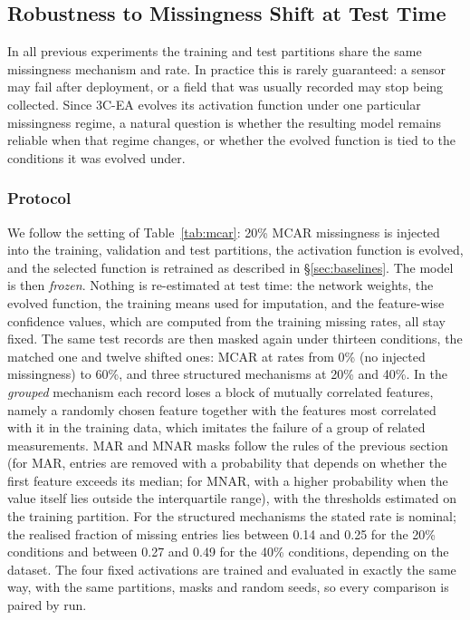 
\subsection{Robustness to Missingness Shift at Test Time}
\label{sec:shift}

In all previous experiments the training and test partitions share the same missingness mechanism and rate. In practice
this is rarely guaranteed: a sensor may fail after deployment, or a field that was usually recorded may stop being
collected. Since 3C-EA evolves its activation function under one particular missingness regime, a natural question is
whether the resulting model remains reliable when that regime changes, or whether the evolved function is tied to the
conditions it was evolved under.

\subsubsection{Protocol}
We follow the setting of Table~\ref{tab:mcar}: 20\% MCAR missingness is injected into the training, validation and
test partitions, the activation function is evolved, and the selected function is retrained as described in
\S\ref{sec:baselines}. The model is then \emph{frozen}. Nothing is re-estimated at test time: the network weights, the
evolved function, the training means used for imputation, and the feature-wise confidence values, which are computed
from the training missing rates, all stay fixed. The same test records are then masked again under thirteen
conditions, the matched one and twelve shifted ones: MCAR at rates from 0\% (no injected missingness) to 60\%, and three structured mechanisms at 20\% and
40\%. In the \emph{grouped} mechanism each record loses a block of mutually correlated features, namely a randomly
chosen feature together with the features most correlated with it in the training data, which imitates the failure of
a group of related measurements. MAR and MNAR masks follow the rules of the previous section (for MAR, entries are
removed with a probability that depends on whether the first feature exceeds its median; for MNAR, with a higher
probability when the value itself lies outside the interquartile range), with the thresholds estimated on the training
partition. For the structured
mechanisms the stated rate is nominal; the realised fraction of missing entries lies between 0.14 and 0.25 for the
20\% conditions and between 0.27 and 0.49 for the 40\% conditions, depending on the dataset. The four fixed
activations are trained and evaluated in exactly the same way, with the same partitions, masks and random seeds, so
every comparison is paired by run.

